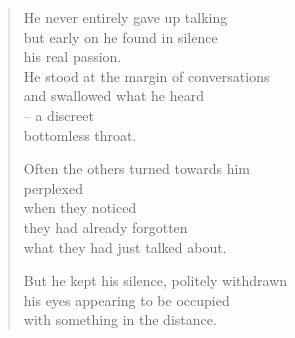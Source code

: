 

\begin{verse}
He never entirely gave up talking\\
but early on he found in silence\\
his real passion.\\
He stood at the margin of conversations\\
and swallowed what he heard\\
-- a discreet\\
bottomless throat.

Often the others turned towards him\\
perplexed\\
when they noticed\\
they had already forgotten\\
what they had just talked about.

But he kept his silence, politely withdrawn\\
his eyes appearing to be occupied\\
with something in the distance.
\end{verse}
